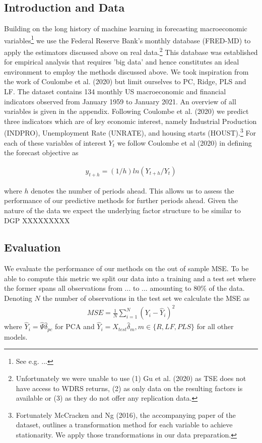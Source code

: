 \subsection{Introduction and Data}
Building on the long history of machine learning in forecasting macroeconomic variables\footnote{See e.g. ...} we use the Federal Reserve Bank's monthly database (FRED-MD) to apply the estimators discussed above on real data.\footnote{Unfortunately we were unable to use (1) Gu et al. (2020) as TSE does not have access to WDRS returns, (2) as only data on the resulting factors is available or (3) as they do not offer any replication data.} This database was established for empirical analysis that requires 'big data' and hence constitutes an ideal environment to employ the methods discussed above. We took inspiration from the work of Coulombe et al. (2020) but limit ourselves to PC, Ridge, PLS and LF. 
The dataset contains 134 monthly US macroeconomic and financial indicators observed from January 1959 to January 2021. An overview of all variables is given in the appendix. 
Following Coulombe et al. (2020) we predict three indicators which are of key economic interest, namely Industrial Production (INDPRO), Unemployment Rate (UNRATE), and housing starts (HOUST).\footnote{Fortunately McCracken and Ng (2016), the accompanying paper of the dataset, outlines a transformation method for each variable to achieve stationarity. We apply those transformations in our data preparation.}
For each of these variables of interest $Y_t$ we follow Coulombe et al (2020) in defining the forecast objective as

\begin{align*}
	y_{t+h} = (1/h) ln(Y_{t+h}/Y_t)
\end{align*}

where $h$ denotes the number of periods ahead. This allows us to assess the performance of our predictive methods for further periods ahead.
Given the nature of the data we expect the underlying factor structure to be similar to DGP XXXXXXXXX 

\subsection{Evaluation}
We evaluate the performance of our methods on the out of sample MSE. To be able to compute this metric we split our data into a training and a test set where the former spans all observations from ... to ... amounting to 80\% of the data. Denoting $N$ the number of observations in the test set we calculate the MSE as
\begin{align*}
	    MSE = \frac{1}{N} \sum_{i=1}^N (Y_i - \widehat{Y}_i)^2
\end{align*}
where $\widehat{Y}_i = \widehat{\Psi} \widehat{\delta}_{pc}$ for PCA and $\widehat{Y}_i = X_{test} \widehat{\delta}_{m}, m \in \{R, LF, PLS\}$ for all other models. 

